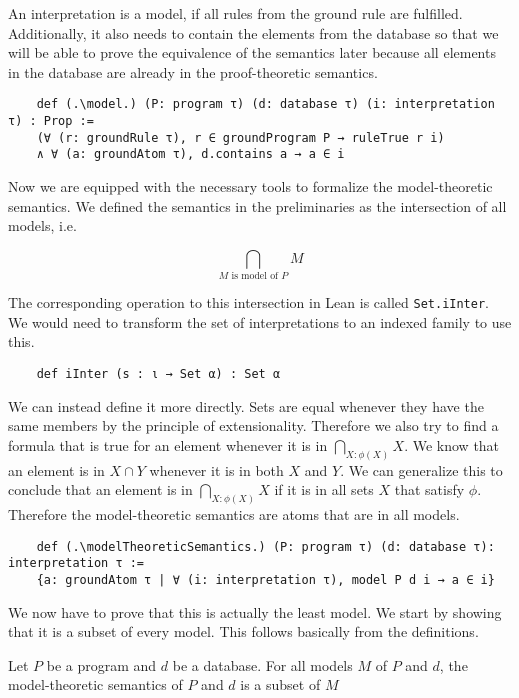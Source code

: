 An interpretation is a model, if all rules from the ground rule are fulfilled. Additionally, it also needs to contain the elements from the database so that we will be able to prove the equivalence of the semantics later because all elements in the database are already in the proof-theoretic semantics.

\begin{lstlisting}
    def (.\model.) (P: program τ) (d: database τ) (i: interpretation τ) : Prop := 
    (∀ (r: groundRule τ), r ∈ groundProgram P → ruleTrue r i) 
    ∧ ∀ (a: groundAtom τ), d.contains a → a ∈ i
\end{lstlisting}

Now we are equipped with the necessary tools to formalize the model-theoretic semantics.  We defined the semantics in the preliminaries as the intersection of all models, i.e.

\[\bigcap_{\text{$M$ is model of $P$}} M\] 

The corresponding operation to this intersection in Lean is called \lstinline|Set.iInter|. We would need to transform the set of interpretations to an indexed family to use this.

\begin{lstlisting}
    def iInter (s : ι → Set α) : Set α
\end{lstlisting}

We can instead define it more directly. Sets are equal whenever they have the same members by the principle of extensionality. Therefore we also try to find a formula that is true for an element whenever it is in $\bigcap_{X: \phi(X) } X $. We know that an element is in $X \cap Y$ whenever it is in both $X$ and $Y$. We can generalize this to conclude that an element is in $\bigcap_{X: \phi(X) } X $ if it is in all sets $X$ that satisfy $\phi$. Therefore the model-theoretic semantics are atoms that are in all models.

\begin{lstlisting}
    def (.\modelTheoreticSemantics.) (P: program τ) (d: database τ): interpretation τ := 
    {a: groundAtom τ | ∀ (i: interpretation τ), model P d i → a ∈ i}
\end{lstlisting}

We now have to prove that this is actually the least model. We start by showing that it is a subset of every model. This follows basically from the definitions.

\begin{lemma}[\leastModel]\label{lem:leastModel}
    Let $P$ be a program and $d$ be a database. For all models $M$ of $P$ and $d$, the model-theoretic semantics of $P$ and $d$ is a subset of $M$
\end{lemma}

